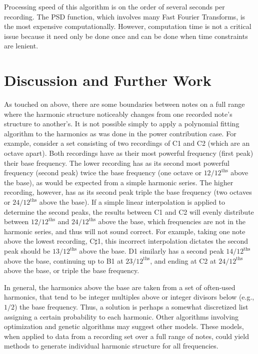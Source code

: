 \documentclass[twocolumn]{article}
\begin{document}
Processing speed of this algorithm is on the order of several seconds per recording. The PSD function, which involves many Fast Fourier Transforms, is the most expensive computationally. However, computation time is not a critical issue because it need only be done once and can be done when time constraints are lenient.

\section{Discussion and Further Work}

As touched on above, there are some boundaries between notes on a full range where the harmonic structure noticeably changes from one recorded note's structure to another's. It is not possible simply to apply a polynomial fitting algorithm to the harmonics as was done in the power contribution case. For example, consider a set consisting of two recordings of C1 and C2 (which are an octave apart). Both recordings have as their most powerful frequency (first peak) their base frequency. The lower recording has as its second most powerful frequency (second peak) twice the base frequency (one octave or $12/12^\mathrm{ths}$ above the base), as would be expected from a simple harmonic series. The higher recording, however, has as its second peak triple the base frequency (two octaves or $24/12^\mathrm{ths}$ above the base). If a simple linear interpolation is applied to determine the second peaks, the results between C1 and C2 will evenly distribute between $12/12^\mathrm{ths}$ and $24/12^\mathrm{ths}$ above the base, which frequencies are not in the harmonic series, and thus will not sound correct. For example, taking one note above the lowest recording, C$\sharp$1, this incorrect interpolation dictates the second peak should be $13/12^\mathrm{ths}$ above the base. D1 similarly has a second peak $14/12^\mathrm{ths}$ above the base, continuing up to B1 at $23/12^\mathrm{ths}$, and ending at C2 at $24/12^\mathrm{ths}$ above the base, or triple the base frequency.

In general, the harmonics above the base are taken from a set of often-used harmonics, that tend to be integer multiples above or integer divisors below (e.g., $1/2$) the base frequency. Thus, a solution is perhaps a somewhat discretized list assigning a certain probability to each harmonic. Other algorithms involving optimization and genetic algorithms may suggest other models. These models, when applied to data from a recording set over a full range of notes, could yield methods to generate individual harmonic structure for all frequencies.
\end{document}
